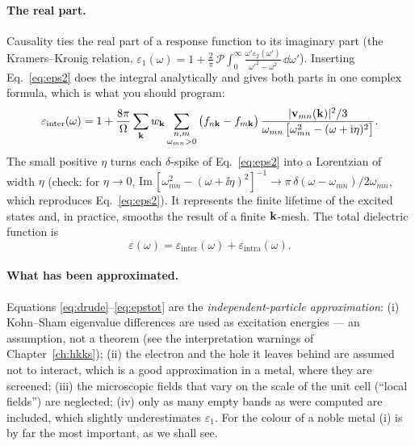 \paragraph{The real part.} Causality ties the real part of a response
function to its imaginary part (the Kramers--Kronig relation,
$\varepsilon_1(\omega) = 1 + \tfrac{2}{\pi}\,\mathcal P\!\!\int_0^\infty
\frac{\omega'\varepsilon_2(\omega')}{\omega'^2-\omega^2}\,\dd\omega'$).
Inserting Eq.~\eqref{eq:eps2} does the integral analytically and gives
both parts in one complex formula, which is what you should program:
\begin{equation}
\varepsilon_{\mathrm{inter}}(\omega) = 1 + \frac{8\pi}{\Omega}
\sum_{\mathbf{k}} w_{\mathbf{k}} \sum_{\substack{n,m\\ \omega_{mn}>0}}
\big(f_{n\mathbf{k}}-f_{m\mathbf{k}}\big)\,
\frac{|\mathbf v_{mn}(\mathbf{k})|^2/3}
{\omega_{mn}\,\big[\omega_{mn}^2 - (\omega + \mathrm{i}\eta)^2\big]} .
\label{eq:epsinter}
\end{equation}
The small positive $\eta$ turns each $\delta$-spike of
Eq.~\eqref{eq:eps2} into a Lorentzian of width $\eta$ (check: for
$\eta\to0$, $\mathrm{Im}\,[\omega_{mn}^2-(\omega+\ii\eta)^2]^{-1} \to
\pi\,\delta(\omega-\omega_{mn})/2\omega_{mn}$, which reproduces
Eq.~\eqref{eq:eps2}). It represents the finite lifetime of the excited
states and, in practice, smooths the result of a finite $\mathbf{k}$-mesh. The
total dielectric function is
\begin{equation}
\varepsilon(\omega) = \varepsilon_{\mathrm{inter}}(\omega)
+ \varepsilon_{\mathrm{intra}}(\omega) .
\label{eq:epstot}
\end{equation}

\paragraph{What has been approximated.} Equations
\eqref{eq:drude}--\eqref{eq:epstot} are the \emph{independent-particle
approximation}: (i) Kohn--Sham eigenvalue differences are used as
excitation energies --- an assumption, not a theorem (see the
interpretation warnings of Chapter~\ref{ch:hkks}); (ii) the electron and
the hole it leaves behind are assumed not to interact, which is a good
approximation in a metal, where they are screened; (iii) the microscopic
fields that vary on the scale of the unit cell (``local fields'') are
neglected; (iv) only as many empty bands as were computed are included,
which slightly underestimates $\varepsilon_1$. For the colour of a noble
metal (i) is by far the most important, as we shall see.

